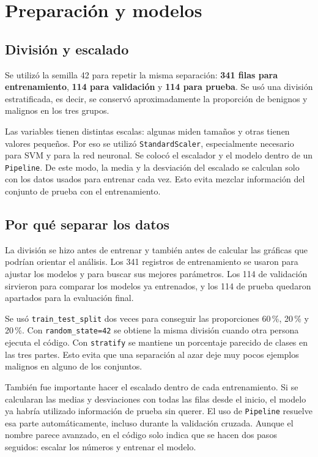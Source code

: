 \documentclass[conference]{IEEEtran}
\begin{document}
\section{Preparación y modelos}
\subsection{División y escalado}
Se utilizó la semilla 42 para repetir la misma separación: \textbf{341 filas para entrenamiento}, \textbf{114 para validación} y \textbf{114 para prueba}. Se usó una división estratificada, es decir, se conservó aproximadamente la proporción de benignos y malignos en los tres grupos.

Las variables tienen distintas escalas: algunas miden tamaños y otras tienen valores pequeños. Por eso se utilizó \texttt{StandardScaler}, especialmente necesario para SVM y para la red neuronal. Se colocó el escalador y el modelo dentro de un \texttt{Pipeline}. De este modo, la media y la desviación del escalado se calculan solo con los datos usados para entrenar cada vez. Esto evita mezclar información del conjunto de prueba con el entrenamiento.


\subsection{Por qué separar los datos}
La división se hizo antes de entrenar y también antes de calcular las gráficas que podrían orientar el análisis. Los 341 registros de entrenamiento se usaron para ajustar los modelos y para buscar sus mejores parámetros. Los 114 de validación sirvieron para comparar los modelos ya entrenados, y los 114 de prueba quedaron apartados para la evaluación final.

Se usó \texttt{train\_test\_split} dos veces para conseguir las proporciones 60\,\%, 20\,\% y 20\,\%. Con \texttt{random\_state=42} se obtiene la misma división cuando otra persona ejecuta el código. Con \texttt{stratify} se mantiene un porcentaje parecido de clases en las tres partes. Esto evita que una separación al azar deje muy pocos ejemplos malignos en alguno de los conjuntos.

También fue importante hacer el escalado dentro de cada entrenamiento. Si se calcularan las medias y desviaciones con todas las filas desde el inicio, el modelo ya habría utilizado información de prueba sin querer. El uso de \texttt{Pipeline} resuelve esa parte automáticamente, incluso durante la validación cruzada. Aunque el nombre parece avanzado, en el código solo indica que se hacen dos pasos seguidos: escalar los números y entrenar el modelo.
\end{document}
